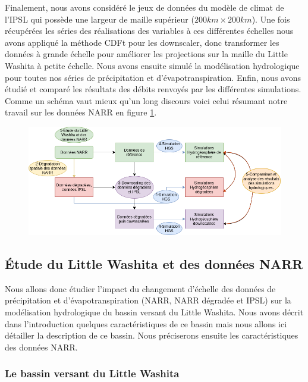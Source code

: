 \documentclass[a4paper,11pt]{article}
\numberwithin{equation}{section}
\begin{document}
Finalement, nous avons considéré le jeux de données du modèle de climat de l'IPSL qui possède une largeur de maille supérieur ($200km\times 200km$). Une fois récupérées les séries des réalisations des variables à ces différentes échelles nous avons appliqué la méthode CDFt pour les downscaler, donc transformer les données à grande échelle pour améliorer les projections sur la maille du Little Washita à petite échelle. Nous avons ensuite simulé la modélisation hydrologique pour toutes nos séries de précipitation et d'évapotranspiration. Enfin, nous avons étudié et comparé les résultats des débits renvoyés par les différentes simulations. Comme un schéma vaut mieux qu'un long discours voici celui résumant notre travail sur les données NARR en figure \ref{fig-methodo}.

\begin{figure}[H]
	\begin{center}
		\includegraphics[scale=0.6]{Diagrame_methodo.png}
	\end{center}
	\label{fig-methodo}
\end{figure}

\subsection{Étude du Little Washita et des données NARR}

Nous allons donc étudier l'impact du changement d'échelle des données de précipitation et d'évapotranspiration (NARR, NARR dégradée et IPSL) sur la modélisation hydrologique du bassin versant du Little Washita. Nous avons décrit dans l'introduction quelques caractéristiques de ce bassin mais nous allons ici détailler la description de ce bassin. Nous préciserons ensuite les caractéristiques des données NARR.

\subsubsection{Le bassin versant du Little Washita}
\end{document}
